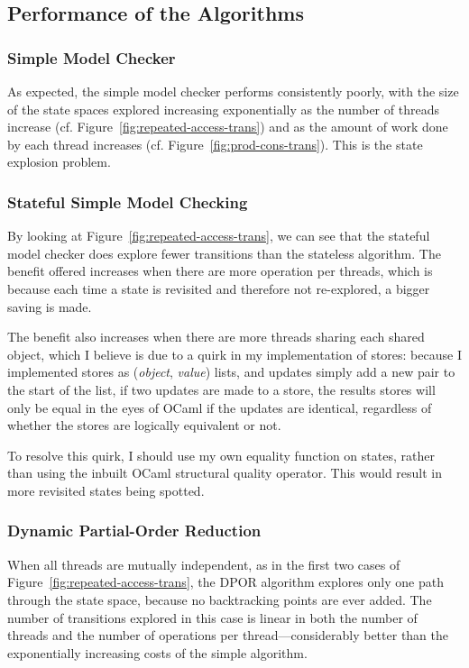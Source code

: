 \documentclass[12pt,a4paper,twoside,openright]{report}
\begin{document}
\subsection{Performance of the Algorithms}

\subsubsection{Simple Model Checker}
As expected, the simple model checker performs
consistently poorly, with the size of the state
spaces explored increasing exponentially as
the number of threads increase (cf.
Figure~\ref{fig:repeated-access-trans})
and as the amount of work done by each thread
increases (cf.
Figure~\ref{fig:prod-cons-trans}).
This is the state explosion problem.

\subsubsection{Stateful Simple Model Checking}
By looking at Figure~\ref{fig:repeated-access-trans},
we can see that the stateful model checker does
explore fewer transitions than the stateless
algorithm. The benefit offered increases
when there are more operation per threads,
which is because each time a state is
revisited and therefore not re-explored,
a bigger saving is made.

The benefit also increases when there are more
threads sharing each shared object, which I
believe is due to a quirk in my implementation
of stores: because I implemented stores as
(\textit{object}, \textit{value}) lists,
and updates simply
add a new pair to the start of the list,
if two updates are made to a store, the
results stores will only be equal in
the eyes of OCaml if the updates are
identical, regardless of whether the
stores are logically equivalent or not.

To resolve this quirk, I should use
my own equality function on states,
rather than using the inbuilt
OCaml structural quality operator.
This would result in more
revisited states being spotted.

\subsubsection{Dynamic Partial-Order Reduction}
When all threads are mutually independent,
as in the first two cases of
Figure~\ref{fig:repeated-access-trans},
the DPOR algorithm explores only one path
through the state space, because no
backtracking points are ever added.
The number of
transitions explored in this case is linear in both
the number of threads and the number of operations
per thread---considerably better
than the exponentially increasing costs
of the simple algorithm.
\end{document}
